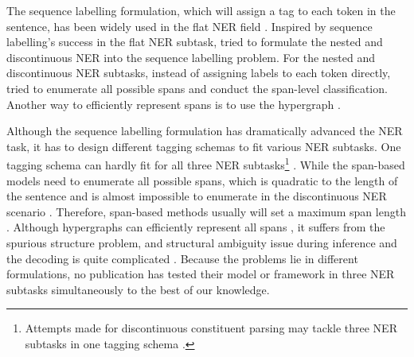 \documentclass[11pt,a4paper]{article}
\begin{document}
The sequence labelling formulation, which will assign a tag to each token in the sentence, has been widely used in the flat NER field \citep{DBLP:conf/conll/McCallum003,DBLP:journals/jmlr/CollobertWBKKK11,DBLP:journals/corr/HuangXY15,DBLP:journals/tacl/ChiuN16,DBLP:conf/naacl/LampleBSKD16,DBLP:conf/acl/StrakovaSH19,DBLP:journals/corr/abs-1911-04474,DBLP:conf/acl/LiYQH20}. Inspired by sequence labelling's success in the flat NER subtask, \citet{DBLP:conf/semweb/Metke-JimenezK16,DBLP:conf/emnlp/MuisL17} tried to formulate the nested and discontinuous NER into the sequence labelling problem. For the nested and discontinuous NER subtasks, instead of assigning labels to each token directly, \citet{DBLP:conf/acl/XuJW17,DBLP:conf/emnlp/WangL19,DBLP:conf/acl/YuBP20,DBLP:conf/acl/LiFMHWL20} tried to enumerate all possible spans and conduct the span-level classification. Another way to efficiently represent spans is to use the hypergraph \citep{DBLP:conf/emnlp/LuR15,DBLP:conf/naacl/KatiyarC18,DBLP:conf/emnlp/WangL18,DBLP:conf/emnlp/MuisL16}.




Although the sequence labelling formulation has dramatically advanced the NER task, it has to design different tagging schemas to fit various NER subtasks. One tagging schema can hardly fit for all three NER subtasks\footnote{Attempts made for discontinuous constituent parsing may tackle three NER subtasks in one tagging schema \cite{DBLP:conf/emnlp/VilaresG20}.} \citep{DBLP:conf/conll/RatinovR09,DBLP:conf/semweb/Metke-JimenezK16,DBLP:conf/acl/StrakovaSH19,DBLP:conf/acl/DaiKHP20}. While the span-based models need to enumerate all possible spans, which is quadratic to the length of the sentence and is almost impossible to enumerate in the discontinuous NER scenario \citep{DBLP:conf/acl/YuBP20}. Therefore, span-based methods usually will set a maximum span length \citep{DBLP:conf/acl/XuJW17,DBLP:conf/naacl/LuanWHSOH19,DBLP:conf/emnlp/WangL18}. Although hypergraphs can efficiently represent all spans \citep{DBLP:conf/emnlp/LuR15,DBLP:conf/naacl/KatiyarC18,DBLP:conf/emnlp/MuisL16}, it suffers from the spurious structure problem, and structural ambiguity issue during inference and the decoding is quite complicated \citep{DBLP:conf/emnlp/MuisL17}. Because the problems lie in different formulations, no publication has tested their model or framework in three NER subtasks simultaneously to the best of our knowledge.
\end{document}
